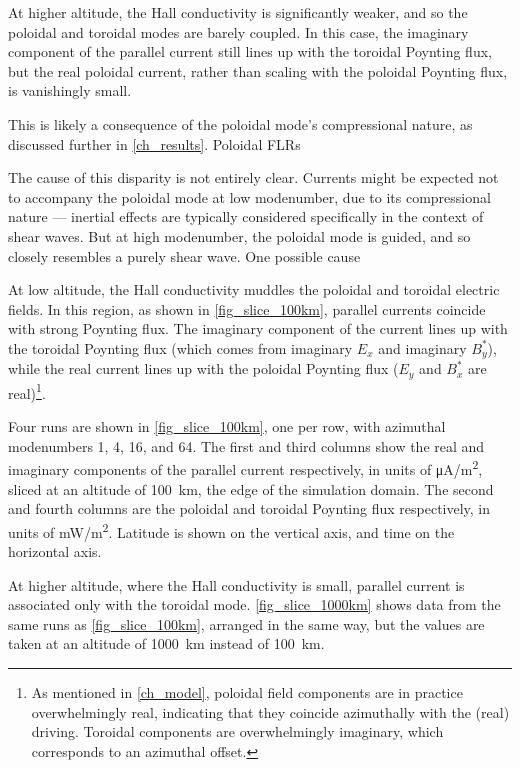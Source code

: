 At higher altitude, the Hall conductivity is significantly weaker, and so the poloidal and toroidal modes are barely coupled. In this case, the imaginary component of the parallel current still lines up with the toroidal Poynting flux, but the real poloidal current, rather than scaling with the poloidal Poynting flux, is vanishingly small. 


This is likely a consequence of the poloidal mode's compressional nature, as discussed further in \cref{ch_results}. Poloidal FLRs 



The cause of this disparity is not entirely clear. Currents might be expected not to accompany the poloidal mode at low modenumber, due to its compressional nature --- inertial effects are typically considered specifically in the context of shear \Alfven waves\cite{lysak_2003,tikhonchuk_2000}. But at high modenumber, the poloidal mode is guided, and so closely resembles a purely shear \Alfven wave. One possible cause 








At low altitude, the Hall conductivity muddles the poloidal and toroidal electric fields. In this region, as shown in \cref{fig_slice_100km}, parallel currents coincide with strong Poynting flux. The imaginary component of the current lines up with the toroidal Poynting flux (which comes from imaginary $E_x$ and imaginary $B_y^*$), while the real current lines up with the poloidal Poynting flux ($E_y$ and $B_x^*$ are real)\footnote{As mentioned in \cref{ch_model}, poloidal field components are in practice overwhelmingly real, indicating that they coincide azimuthally with the (real) driving. Toroidal components are overwhelmingly imaginary, which corresponds to an azimuthal offset. }. 

Four runs are shown in \cref{fig_slice_100km}, one per row, with azimuthal modenumbers 1, 4, 16, and 64. The first and third columns show the real and imaginary components of the parallel current respectively, in units of \si{\uA/\m\squared}, sliced at an altitude of \SI{100}{\km}, the edge of the simulation domain. The second and fourth columns are the poloidal and toroidal Poynting flux respectively, in units of \si{\mW/\m\squared}. Latitude is shown on the vertical axis, and time on the horizontal axis. 

At higher altitude, where the Hall conductivity is small, parallel current is associated only with the toroidal mode. \cref{fig_slice_1000km} shows data from the same runs as \cref{fig_slice_100km}, arranged in the same way, but the values are taken at an altitude of \SI{1000}{\km} instead of \SI{100}{\km}. 

